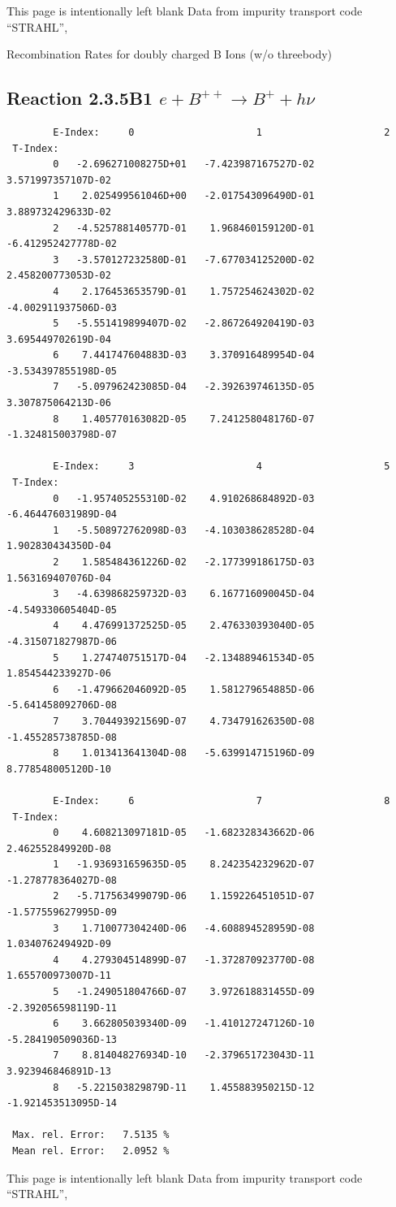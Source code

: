 \documentclass[12pt,dvips]{article}
\begin{document}
\newpage
This page is intentionally left blank
\newpage
Data from impurity transport code ``STRAHL'', \cite{kn:Behringer}

  Recombination Rates for doubly charged B Ions (w/o threebody)
\subsection{
Reaction 2.3.5B1  $e + B^{++} \rightarrow B^+ + h\nu$
}

\begin{small}\begin{verbatim}
        E-Index:     0                     1                     2
 T-Index:
        0   -2.696271008275D+01   -7.423987167527D-02    3.571997357107D-02
        1    2.025499561046D+00   -2.017543096490D-01    3.889732429633D-02
        2   -4.525788140577D-01    1.968460159120D-01   -6.412952427778D-02
        3   -3.570127232580D-01   -7.677034125200D-02    2.458200773053D-02
        4    2.176453653579D-01    1.757254624302D-02   -4.002911937506D-03
        5   -5.551419899407D-02   -2.867264920419D-03    3.695449702619D-04
        6    7.441747604883D-03    3.370916489954D-04   -3.534397855198D-05
        7   -5.097962423085D-04   -2.392639746135D-05    3.307875064213D-06
        8    1.405770163082D-05    7.241258048176D-07   -1.324815003798D-07

        E-Index:     3                     4                     5
 T-Index:
        0   -1.957405255310D-02    4.910268684892D-03   -6.464476031989D-04
        1   -5.508972762098D-03   -4.103038628528D-04    1.902830434350D-04
        2    1.585484361226D-02   -2.177399186175D-03    1.563169407076D-04
        3   -4.639868259732D-03    6.167716090045D-04   -4.549330605404D-05
        4    4.476991372525D-05    2.476330393040D-05   -4.315071827987D-06
        5    1.274740751517D-04   -2.134889461534D-05    1.854544233927D-06
        6   -1.479662046092D-05    1.581279654885D-06   -5.641458092706D-08
        7    3.704493921569D-07    4.734791626350D-08   -1.455285738785D-08
        8    1.013413641304D-08   -5.639914715196D-09    8.778548005120D-10

        E-Index:     6                     7                     8
 T-Index:
        0    4.608213097181D-05   -1.682328343662D-06    2.462552849920D-08
        1   -1.936931659635D-05    8.242354232962D-07   -1.278778364027D-08
        2   -5.717563499079D-06    1.159226451051D-07   -1.577559627995D-09
        3    1.710077304240D-06   -4.608894528959D-08    1.034076249492D-09
        4    4.279304514899D-07   -1.372870923770D-08    1.655700973007D-11
        5   -1.249051804766D-07    3.972618831455D-09   -2.392056598119D-11
        6    3.662805039340D-09   -1.410127247126D-10   -5.284190509036D-13
        7    8.814048276934D-10   -2.379651723043D-11    3.923946846891D-13
        8   -5.221503829879D-11    1.455883950215D-12   -1.921453513095D-14

 Max. rel. Error:   7.5135 %
 Mean rel. Error:   2.0952 %

\end{verbatim}\end{small}
\newpage
This page is intentionally left blank
\newpage
Data from impurity transport code ``STRAHL'', \cite{kn:Behringer}
\end{document}
